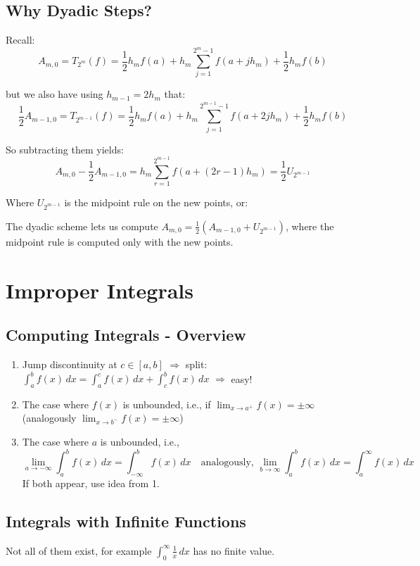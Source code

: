 \subsection{Why Dyadic Steps?}

Recall:
\[A_{m,0} = T_{2^m}(f) = \frac{1}{2} h_m f(a) + h_m \sum_{j=1}^{2^m-1} f(a + jh_m) + \frac{1}{2} h_m f(b)\]

but we also have using $h_{m-1} = 2h_m$ that:
\[\frac{1}{2} A_{m-1,0} = T_{2^{m-1}}(f) = \frac{1}{2} h_m f(a) + h_m \sum_{j=1}^{2^{m-1}-1} f(a + 2jh_m) + \frac{1}{2} h_m f(b)\]

So subtracting them yields:
\[A_{m,0} - \frac{1}{2} A_{m-1,0} = h_m \sum_{r=1}^{2^{m-1}} f(a + (2r-1)h_m) = \frac{1}{2} U_{2^{m-1}}\]

Where $U_{2^{m-1}}$ is the midpoint rule on the new points, or:

The dyadic scheme lets us compute $A_{m,0} = \frac{1}{2}(A_{m-1,0} + U_{2^{m-1}})$, where the midpoint rule is computed only with the new points.

\section{Improper Integrals}

\subsection{Computing Integrals - Overview}
\begin{enumerate}
  \item Jump discontinuity at $c \in [a,b]$ $\Rightarrow$ split: $\int_a^b f(x) \, dx = \int_a^c f(x) \, dx + \int_c^b f(x) \, dx$ $\Rightarrow$ easy!
  \item The case where $f(x)$ is unbounded, i.e., if $\lim_{x \to a^+} f(x) = \pm\infty$ (analogously $\lim_{x \to b^-} f(x) = \pm\infty$)
  \item The case where $a$ is unbounded, i.e.,
  \[
    \lim_{a \to -\infty} \int_a^b f(x) \, dx = \int_{-\infty}^b f(x) \, dx
    \quad \text{analogously, } \lim_{b \to \infty} \int_a^b f(x) \, dx = \int_a^{\infty} f(x) \, dx
  \]
  If both appear, use idea from 1.
\end{enumerate}

\subsection{Integrals with Infinite Functions}

Not all of them exist, for example $\int_0^{\infty} \frac{1}{x} \, dx$ has no finite value.

